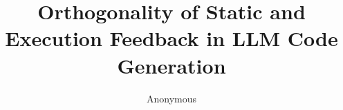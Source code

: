 \documentclass[letterpaper]{article}
\title{Orthogonality of Static and Execution Feedback in LLM Code Generation}
\author{Anonymous}
\date{}
\begin{document}
\maketitle

\begin{abstract}

\end{abstract}











\end{document}
